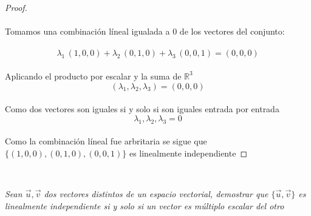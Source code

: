 \documentclass[11pt,letterpaper]{article}
\newcommand{\R}{\mathbb{R}}
\begin{document}
\begin{proof}\,\\
    \,\\
    Tomamos una combinaci\'on l\'ineal igualada a $0$ de los vectores del conjunto:\,\\
    \,\\
    \begin{equation*}
        \lambda_1\,(1,0,0)+\lambda_2\,(0,1,0)+\lambda_3\,(0,0,1)=(0,0,0)
    \end{equation*}\,\\
    Aplicando el producto por escalar y la suma de $\R^3$\,\\
    \begin{equation*}
        (\lambda_1,\lambda_2,\lambda_3)=(0,0,0)
    \end{equation*}\,\\
    Como dos vectores son iguales si y solo si son iguales entrada por entrada\,\\
    \begin{equation*}
        \lambda_1,\lambda_2,\lambda_3=0
    \end{equation*}\,\\
    Como la combinaci\'on l\'ineal fue arbritaria se sigue que $\{(1,0,0),(0,1,0),(0,0,1)\}$ es linealmente independiente
\end{proof}\,\\
\begin{tcolorbox}[
	title = \textcolor{black}{\textcolor{white}{Problema 9}},]
\textit{Sean $\vec{u},\vec{v}$ dos vectores distintos de un espacio vectorial, demostrar que $\{\vec{u},\vec{v}\}$
es linealmente independiente si y solo si un vector es m\'ultiplo escalar del otro
}
\end{tcolorbox}\,\\
\end{document}
